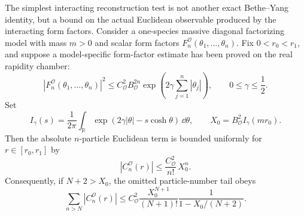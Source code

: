 \begin{controlledapproximation}
\label{ca:interacting-form-factor-growth-window}
The simplest interacting reconstruction test is not another exact
Bethe--Yang identity, but a bound on the actual Euclidean observable produced
by the interacting form factors.  Consider a one-species massive diagonal
factorizing model with mass \(m>0\) and scalar form factors
\(F_n^{\mathcal O}(\theta_1,\ldots,\theta_n)\).  Fix
\(0<r_0<r_1\), and suppose a model-specific form-factor estimate has been
proved on the real rapidity chamber:
\begin{equation}
  |F_n^{\mathcal O}(\theta_1,\ldots,\theta_n)|^2
  \le
  C_{\mathcal O}^2 B_{\mathcal O}^{2n}
  \exp\!\left(2\gamma\sum_{j=1}^n|\theta_j|\right),
  \qquad
  0\le\gamma\le\frac12 .
  \label{eq:interacting-form-factor-growth-bound}
\end{equation}
Set
\begin{equation}
  I_\gamma(s)
  =
  \frac1{2\pi}
  \int_{\mathbb R}
  \exp\!\left(2\gamma|\theta|-s\cosh\theta\right)\,\dd\theta,
  \qquad
  X_0=B_{\mathcal O}^2I_\gamma(mr_0).
  \label{eq:interacting-form-factor-one-particle-majorant}
\end{equation}
Then the absolute \(n\)-particle Euclidean term is bounded uniformly for
\(r\in[r_0,r_1]\) by
\begin{equation}
  |C_n^{\mathcal O}(r)|
  \le
  \frac{C_{\mathcal O}^2}{n!}\,X_0^n .
  \label{eq:interacting-form-factor-sector-bound}
\end{equation}
Consequently, if \(N+2>X_0\), the omitted particle-number tail obeys
\begin{equation}
  \sum_{n>N}|C_n^{\mathcal O}(r)|
  \le
  C_{\mathcal O}^2
  \frac{X_0^{N+1}}{(N+1)!}
  \frac{1}{1-X_0/(N+2)} .
  \label{eq:interacting-form-factor-particle-tail-bound}
\end{equation}


\end{controlledapproximation}
